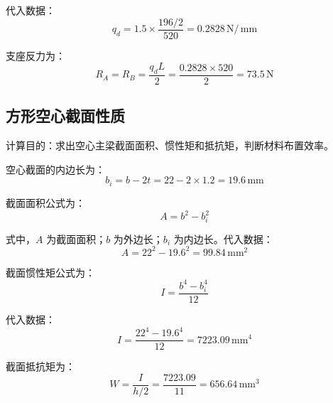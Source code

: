 \documentclass[UTF8,a4paper,12pt,fontset=none]{ctexart}
\numberwithin{equation}{section}
\numberwithin{figure}{section}
\numberwithin{table}{section}
\newcommand{\mm}{\,\mathrm{mm}}
\newcommand{\Nunit}{\,\mathrm{N}}
\begin{document}
代入数据：
\begin{equation}
  q_d=1.5\times\frac{196/2}{520}=0.2828\Nunit/\mm
\end{equation}

支座反力为：
\begin{equation}
  R_A=R_B=\frac{q_dL}{2}=\frac{0.2828\times520}{2}=73.5\Nunit
\end{equation}

\subsection{方形空心截面性质}
计算目的：求出空心主梁截面面积、惯性矩和抵抗矩，判断材料布置效率。

空心截面的内边长为：
\begin{equation}
  b_i=b-2t=22-2\times1.2=19.6\mm
\end{equation}

截面面积公式为：
\begin{equation}
  A=b^2-b_i^2
\end{equation}

式中，$A$ 为截面面积；$b$ 为外边长；$b_i$ 为内边长。代入数据：
\begin{equation}
  A=22^2-19.6^2=99.84\mm^2
\end{equation}

截面惯性矩公式为：
\begin{equation}
  I=\frac{b^4-b_i^4}{12}
\end{equation}

代入数据：
\begin{equation}
  I=\frac{22^4-19.6^4}{12}=7223.09\mm^4
\end{equation}

截面抵抗矩为：
\begin{equation}
  W=\frac{I}{h/2}=\frac{7223.09}{11}=656.64\mm^3
\end{equation}
\end{document}
